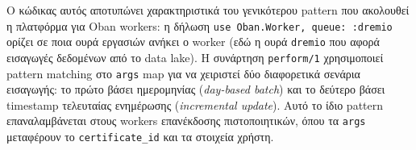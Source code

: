 \begin{Shaded}
\begin{Highlighting}[]
   
  \FunctionTok{(}\NormalTok{\%}\FunctionTok{\{}\NormalTok{ \%}\FunctionTok{\{} \OperatorTok{=\textgreater{}} \OperatorTok{=\textgreater{}} \OperatorTok{=\textgreater{}}\FunctionTok{\}\})} 
\OperatorTok{=} \OperatorTok{\textasciitilde{}}\OtherTok{[} \NormalTok{:}\NormalTok{:}\OtherTok{]}

\OperatorTok{=} \FunctionTok{(}\FunctionTok{)} \OperatorTok{|\textgreater{}} \FunctionTok{(}\FunctionTok{)}

\OperatorTok{=}
      \FunctionTok{(}\NormalTok{\%}\FunctionTok{\{}
      \FunctionTok{\})}

    \FunctionTok{\{}\FunctionTok{\}}
\end{Highlighting}
\end{Shaded}

Ο κώδικας αυτός αποτυπώνει χαρακτηριστικά του γενικότερου pattern που
ακολουθεί η πλατφόρμα για Oban workers: η δήλωση
\texttt{use\ Oban.Worker,\ queue:\ :dremio} ορίζει σε ποια ουρά εργασιών
ανήκει ο worker (εδώ η ουρά \texttt{dremio} που αφορά εισαγωγές
δεδομένων από το data lake). Η συνάρτηση \texttt{perform/1} χρησιμοποιεί
pattern matching στο \texttt{args} map για να χειριστεί δύο διαφορετικά
σενάρια εισαγωγής: το πρώτο βάσει ημερομηνίας (\emph{day-based batch})
και το δεύτερο βάσει timestamp τελευταίας ενημέρωσης (\emph{incremental
update}). Αυτό το ίδιο pattern επαναλαμβάνεται στους workers επανέκδοσης
πιστοποιητικών, όπου τα \texttt{args} μεταφέρουν το
\texttt{certificate\_id} και τα στοιχεία χρήστη.

